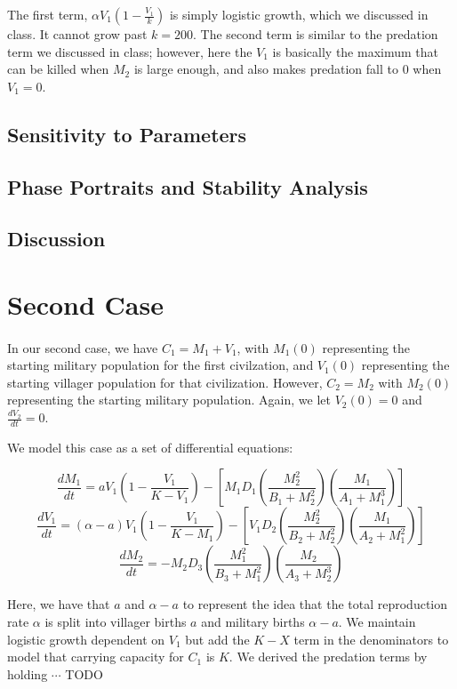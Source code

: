 \documentclass[12pt]{article}
\begin{document}
The first term, $\alpha V_1(1-\frac{V_1}{k})$ is simply logistic growth, which we discussed in class. It cannot grow past $k = 200$. The second term is similar to the predation term we discussed in class; however, here the $V_1$ is basically the maximum that can be killed when $M_2$ is large enough, and also makes predation fall to $0$ when $V_1 = 0$.

\subsection{Sensitivity to Parameters}

\subsection{Phase Portraits and Stability Analysis}

\subsection{Discussion}

\section{Second Case} 
\paragraph{}
In our second case, we have $C_1 = M_1 + V_1$, with $M_1(0)$ representing the starting military population for the first civilzation, and $V_1(0)$ representing the starting villager population for that civilization. However, $C_2 = M_2$ with $M_2(0)$ representing the starting military population. Again, we let $V_2(0) = 0$ and $\frac{dV_2}{dt} = 0$. \par

We model this case as a set of differential equations: 

$$\frac{dM_1}{dt}=aV_1(1-\frac{V_1}{K-V_1})-[M_1D_1(\frac{M_2^2}{B_1+M_2^2})(\frac{M_1}{A_1+M_1^3})]$$
$$\frac{dV_1}{dt}=(\alpha - a)V_1(1-\frac{V_1}{K-M_1})-[V_1D_2(\frac{M_2^2}{B_2+M_2^2})(\frac{M_1}{A_2 +M_1^2})]$$
$$\frac{dM_2}{dt}=-M_2 D_3(\frac{M_1^2}{B_3+M_1^2})(\frac{M_2}{A_3 +M_2^3}) $$

Here, we have that $a$ and $\alpha - a$ to represent the idea that the total reproduction rate $\alpha$ is split into villager births $a$ and military births $\alpha - a$. We maintain logistic growth dependent on $V_1$ but add the $K - X$ term in the denominators to model that carrying capacity for $C_1$ is $K$. We derived the predation terms by holding $\cdots$ TODO 
\end{document}
